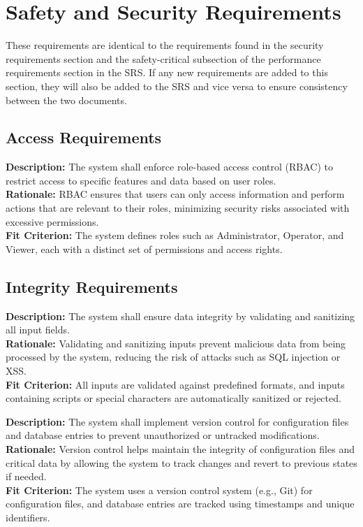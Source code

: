 \documentclass{article}
\begin{document}
\section{Safety and Security Requirements}
These requirements are identical to the requirements found in the security requirements section and the safety-critical subsection of the performance requirements section in the SRS. If any new requirements are added to this section, they will also be added to the SRS and vice versa to ensure consistency between the two documents.   

\subsection{Access Requirements}
\begin{tcolorbox}[title=SEC-ACC1]
\textbf{Description:} The system shall enforce role-based access control (RBAC) to restrict access to specific features and data based on user roles. \\
\textbf{Rationale:} RBAC ensures that users can only access information and perform actions that are relevant to their roles, minimizing security risks associated with excessive permissions. \\
\textbf{Fit Criterion:} The system defines roles such as Administrator, Operator, and Viewer, each with a distinct set of permissions and access rights.
\end{tcolorbox}

\subsection{Integrity Requirements}
\begin{tcolorbox}[title=SEC-INT1]
\textbf{Description:} The system shall ensure data integrity by validating and sanitizing all input fields. \\
\textbf{Rationale:} Validating and sanitizing inputs prevent malicious data from being processed by the system, reducing the risk of attacks such as SQL injection or XSS. \\
\textbf{Fit Criterion:} All inputs are validated against predefined formats, and inputs containing scripts or special characters are automatically sanitized or rejected.
\end{tcolorbox}

\begin{tcolorbox}[title=SEC-INT2]
\textbf{Description:} The system shall implement version control for configuration files and database entries to prevent unauthorized or untracked modifications. \\
\textbf{Rationale:} Version control helps maintain the integrity of configuration files and critical data by allowing the system to track changes and revert to previous states if needed. \\
\textbf{Fit Criterion:} The system uses a version control system (e.g., Git) for configuration files, and database entries are tracked using timestamps and unique identifiers.
\end{tcolorbox}
\end{document}
